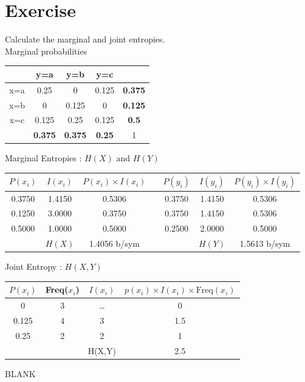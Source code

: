 \documentclass[a4paper,12pt]{article}
\begin{document}
\section*{Exercise}
Calculate the marginal and joint entropies.\\


\noindent Marginal probabilities
\begin{center}
	\begin{tabular}{|c|c|c|c||c|}
		\hline	&	y=a	&	y=b	&	y=c	&		\\ \hline
		x=a	&	0.25	&	0	&	0.125	&	\textbf{0.375}	\\ \hline
		x=b	&	0	&	0.125	&	0	&	\textbf{0.125}	\\ \hline
		x=c	&	0.125	&	0.25	&	0.125	&	\textbf{0.5	}\\ \hline \hline
		&	\textbf{0.375}	&	\textbf{0.375}	&	\textbf{0.25}	&	1	\\ \hline
	\end{tabular}
\end{center}
Marginal Entropies : $H(X)$ and $H(Y)$
\begin{center}
	\begin{tabular}{|c|c|c||c||c|c|c|} \hline
		$P(x_i)$	&	$I(x_i)$	&	$P(x_i) \times I(x_i)$	&&	$P(y_i)$	&	$I(y_i)$	&	$P(y_i) \times I(y_i)$	\\ \hline \hline
		0.3750	&	1.4150	&	0.5306	&&	0.3750	&	1.4150	&	0.5306	\\ \hline
		0.1250	&	3.0000	&	0.3750	&&	0.3750	&	1.4150	&	0.5306	\\ \hline
		0.5000	&	1.0000	&	0.5000	&&	0.2500	&	2.0000	&	0.5000	\\ \hline \hline
		&	$H(X)$	&	1.4056 b/sym	&&		&	$H(Y)$	&	1.5613 b/sym	\\ \hline
	\end{tabular} 
\end{center}
Joint Entropy : $H(X,Y)$
\begin{center}
	\begin{tabular}{|c|c|c|c|}
		\hline
		$P(x_i)$	&	Freq($x_i$)	&	$I(x_i)$	&	$p(x_i)\times I(x_i) \times \mbox{Freq}(x_i)$	\\ \hline
		0	&	3	&	\ldots &	0	\\ \hline
		0.125	&	4	&	3	&	1.5	\\ \hline
		0.25	&	2	&	2	&	1	\\ \hline \hline
		& &H(X,Y) & 2.5 \\ \hline
	\end{tabular} 
\end{center}
\newpage
BLANK
\end{document}
